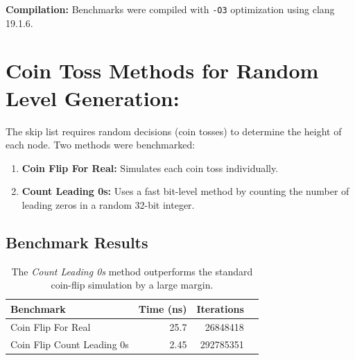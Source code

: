 \documentclass{article}
\begin{document}
\textbf{Compilation:} Benchmarks were compiled with \texttt{-O3} optimization using \textsf{clang 19.1.6}.

\section{Coin Toss Methods for Random Level Generation:}
The skip list requires random decisions (coin tosses) to determine the height of each node. Two methods were benchmarked:
\begin{enumerate}
    \item \textbf{Coin Flip For Real:} Simulates each coin toss individually.
    \item \textbf{Count Leading 0s:} Uses a fast bit-level method by counting the number of leading zeros in a random 32-bit integer.
\end{enumerate}

\subsection{Benchmark Results}
\begin{table}[H]
\centering
\small
\begin{tabular}{lrrr}
\hline
\textbf{Benchmark} & \textbf{Time (ns)}  & \textbf{Iterations} \\
\hline
Coin Flip For Real         & 25.7 & 26848418 \\
Coin Flip Count Leading 0s & 2.45 & 292785351 \\
\hline
\end{tabular}
\caption{The \textit{Count Leading 0s} method outperforms the standard coin-flip simulation by a large margin.}
\label{tab:coin_benchmarks}
\end{table}
\end{document}
